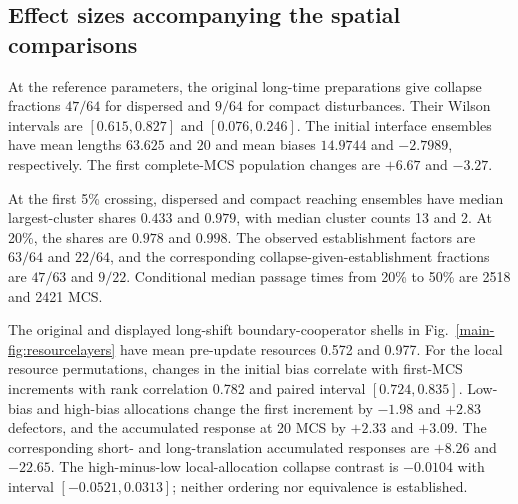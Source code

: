 \subsection{Effect sizes accompanying the spatial comparisons}

At the reference parameters, the original long-time preparations give collapse fractions $47/64$ for dispersed and $9/64$ for compact disturbances. Their Wilson intervals are $[0.615,0.827]$ and $[0.076,0.246]$. The initial interface ensembles have mean lengths $63.625$ and $20$ and mean biases $14.9744$ and $-2.7989$, respectively. The first complete-MCS population changes are $+6.67$ and $-3.27$.

At the first 5\% crossing, dispersed and compact reaching ensembles have median largest-cluster shares $0.433$ and $0.979$, with median cluster counts 13 and 2. At 20\%, the shares are $0.978$ and $0.998$. The observed establishment factors are $63/64$ and $22/64$, and the corresponding collapse-given-establishment fractions are $47/63$ and $9/22$. Conditional median passage times from 20\% to 50\% are 2518 and 2421 MCS.

The original and displayed long-shift boundary-cooperator shells in Fig.~\ref{main-fig:resourcelayers} have mean pre-update resources 0.572 and 0.977. For the local resource permutations, changes in the initial bias correlate with first-MCS increments with rank correlation 0.782 and paired interval $[0.724,0.835]$. Low-bias and high-bias allocations change the first increment by $-1.98$ and $+2.83$ defectors, and the accumulated response at 20 MCS by $+2.33$ and $+3.09$. The corresponding short- and long-translation accumulated responses are $+8.26$ and $-22.65$. The high-minus-low local-allocation collapse contrast is $-0.0104$ with interval $[-0.0521,0.0313]$; neither ordering nor equivalence is established.
